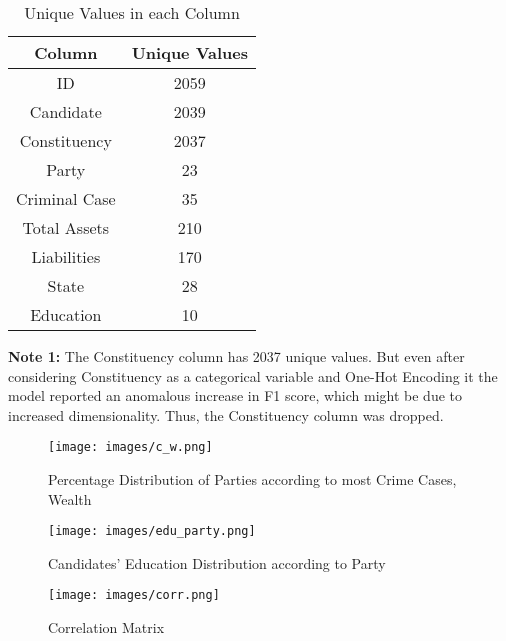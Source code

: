 \documentclass{article}
\begin{document}
\begin{table}[H]
    \centering
    \begin{tabular}{c | c}
        \textbf{Column} & \textbf{Unique Values} \\
        \hline
        ID              & 2059                   \\
        Candidate       & 2039                   \\
        Constituency    & 2037                   \\
        Party           & 23                     \\
        Criminal Case   & 35                     \\
        Total Assets    & 210                    \\
        Liabilities     & 170                    \\
        State           & 28                     \\
        Education       & 10                     \\
    \end{tabular}
    \caption{Unique Values in each Column}
    \label{tab:unique_values}
\end{table}


\begin{tcolorbox}[colback=red!5!white,colframe=red!75!black]
    \textbf{Note 1:} The Constituency column has 2037 unique values. But
    even after considering Constituency as a categorical variable and One-Hot Encoding it
    the model reported an anomalous increase in F1 score, which might be due to increased
    dimensionality. Thus, the Constituency column was dropped.
\end{tcolorbox}

\begin{figure}[H]
    \centering
    \texttt{[image: images/c\_w.png]}
    \caption{Percentage Distribution of Parties according to most Crime Cases, Wealth}
    \label{fig:cw}
\end{figure}

\begin{figure}[H]
    \centering
    \texttt{[image: images/edu\_party.png]}
    \caption{Candidates' Education Distribution according to Party}
    \label{fig:edup}
\end{figure}

\begin{figure}[H]
    \centering
    \texttt{[image: images/corr.png]}
    \caption{Correlation Matrix}
    \label{fig:corr}
\end{figure}
\end{document}
